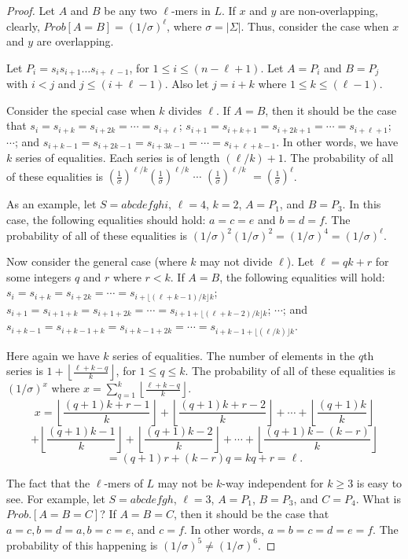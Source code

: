 \begin{proof} Let $A$ and $B$ be any two $\ell$-mers in $L$. If $x$ and $y$ are
non-overlapping, clearly, $Prob[A=B]=(1/\sigma)^{\ell}$, where
$\sigma=|\Sigma|$. Thus, consider the case when $x$ and $y$ are overlapping.

Let $P_i=s_is_{i+1}\ldots s_{i+\ell-1}$, for $1\leq i\leq (n-\ell+1)$. Let
$A=P_i$ and $B=P_j$ with $i< j$ and $j\leq (i+\ell-1)$. Also let $j=i+k$ where
$1\leq k\leq (\ell-1)$.

Consider the special case when $k$ divides $\ell$. If $A=B$, then it should be
the case that $s_i=s_{i+k}=s_{i+2k}=\cdots =s_{i+\ell}$;
$s_{i+1}=s_{i+k+1}=s_{i+2k+1}=\cdots=s_{i+\ell+1}$; $\cdots$; and
$s_{i+k-1}=s_{i+2k-1}=s_{i+3k-1}=\cdots=s_{i+\ell+k-1}$. In other words, we
have $k$ series of equalities. Each series is of length $(\ell/k)+1$. The
probability of all of these equalities is $\left (\frac{1}{\sigma}\right
)^{\ell/k} \left (\frac{1}{\sigma}\right )^{\ell/k}$ $\cdots$  $\left
(\frac{1}{\sigma}\right )^{\ell/k}$ $=\left (\frac{1}{\sigma}\right )^{\ell}$.

As an example, let $S=abcdefghi$, $\ell=4$, $k=2$, $A=P_1$, and $B=P_3$. In
this case, the following equalities should hold: $a=c=e$ and $b=d=f$. The
probability of all of these equalities is $
(1/\sigma)^2(1/\sigma)^2=(1/\sigma)^4=(1/\sigma)^\ell$.

Now consider the general case (where $k$ may not divide $\ell$). Let
$\ell=qk+r$ for some integers $q$ and $r$ where $r<k$. If $A=B$, the following
equalities will hold: $s_i=s_{i+k}=s_{i+2k}=\cdots
=s_{i+\lfloor(\ell+k-1)/k\rfloor k}$;
$s_{i+1}=s_{i+1+k}=s_{i+1+2k}=\cdots=s_{i+1+\lfloor(\ell+k-2)/k\rfloor k}$;
$\cdots$; and
$s_{i+k-1}=s_{i+k-1+k}=s_{i+k-1+2k}=\cdots=s_{i+k-1+\lfloor(\ell/k)\rfloor k}$.

Here again we have $k$ series of equalities. The number of elements in the
$q$th series is $1+\left\lfloor\frac{\ell+k-q}{k}\right\rfloor$, for $1\leq
q\leq k$. The probability of all of these equalities is $(1/\sigma)^x$ where
$x=\sum_{q=1}^k\left\lfloor\frac{\ell+k-q}{k}\right\rfloor$.
$$x=\left\lfloor\frac{(q+1)k+r-1}{k}\right\rfloor+\left\lfloor\frac{(q+1)k+r-2}{k}\right\rfloor+\cdots+\left\lfloor\frac{(q+1)k}{k}\right\rfloor$$
$$+
\left\lfloor\frac{(q+1)k-1}{k}\right\rfloor+\left\lfloor\frac{(q+1)k-2}{k}\right\rfloor+\cdots+\left\lfloor\frac{(q+1)k-(k-r)}{k}\right\rfloor$$
$$=(q+1)r+(k-r)q=kq+r=\ell.$$

The fact that the $\ell$-mers of $L$ may not be $k$-way independent for $k\geq
3$ is easy to see. For example, let $S=abcdefgh$, $\ell=3$, $A=P_1$, $B=P_3$,
and $C=P_4$. What is $Prob.[A=B=C]$? If $A=B=C$, then it should be the case
that $a=c,b=d=a,b=c=e$, and $c=f$. In other words, $a=b=c=d=e=f$. The
probability of this happening is $(1/\sigma)^5\neq(1/\sigma)^6$.  \end{proof}


